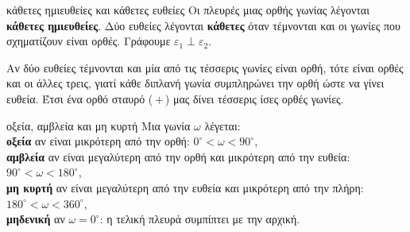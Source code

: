 \begin{orismos}{κάθετες ημιευθείες και κάθετες ευθείες}
Οι πλευρές μιας ορθής γωνίας λέγονται \textbf{κάθετες ημιευθείες}. Δύο ευθείες λέγονται \textbf{κάθετες} όταν τέμνονται και οι γωνίες που σχηματίζουν είναι ορθές. Γράφουμε $\varepsilon_1\perp\varepsilon_2$.
\end{orismos}

Αν δύο ευθείες τέμνονται και μία από τις τέσσερις γωνίες είναι ορθή, τότε είναι ορθές και οι άλλες τρεις, γιατί κάθε διπλανή γωνία συμπληρώνει την ορθή ώστε να γίνει ευθεία. Έτσι ένα ορθό σταυρό (\,$+$\,) μας δίνει τέσσερις ίσες ορθές γωνίες.

\begin{kanonas}{οξεία, αμβλεία και μη κυρτή}
Μια γωνία $\omega$ λέγεται:\\
\textbf{οξεία} αν είναι μικρότερη από την ορθή: $0^\circ<\omega<90^\circ$,\\
\textbf{αμβλεία} αν είναι μεγαλύτερη από την ορθή και μικρότερη από την ευθεία: $90^\circ<\omega<180^\circ$,\\
\textbf{μη κυρτή} αν είναι μεγαλύτερη από την ευθεία και μικρότερη από την πλήρη: $180^\circ<\omega<360^\circ$,\\
\textbf{μηδενική} αν $\omega=0^\circ$: η τελική πλευρά συμπίπτει με την αρχική.
\end{kanonas}

\begin{center}
\end{center}


